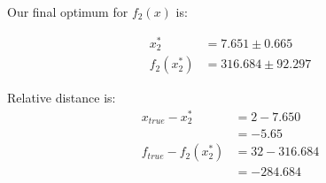 \documentclass[11pt,onside]{article}
\begin{document}
\begin{description}
Our final optimum for $f_{2}(x)$ is:

\begin{align*}
x_{2}^{*} &= 7.651 \pm 0.665 \\
f_{2}(x_{2}^{*}) &= 316.684 \pm 92.297
\end{align*}

Relative distance is:
\begin{align*}
x_{true} - x_{2}^{*} &= 2 - 7.650 \\
                     &= -5.65 \\
f_{true} - f_{2}(x_{2}^{*}) &= 32 - 316.684 \\
                            &= -284.684
\end{align*}

\end{description}
\end{document}
